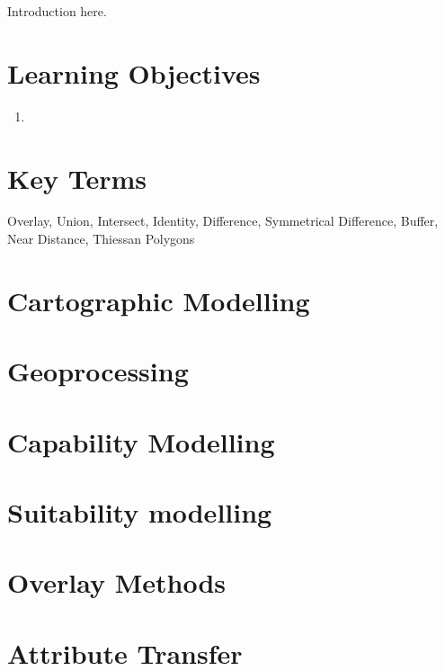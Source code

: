 \documentclass[
]{book}
\providecommand{\tightlist}{%
  \setlength{\itemsep}{0pt}\setlength{\parskip}{0pt}}
\begin{document}
Introduction here.

\hypertarget{learning-objectives-5}{%
\section*{Learning Objectives}\label{learning-objectives-5}}

\begin{enumerate}
\def\labelenumi{\arabic{enumi}.}
\tightlist
\item
\end{enumerate}

\hypertarget{key-terms-5}{%
\section*{Key Terms}\label{key-terms-5}}

Overlay, Union, Intersect, Identity, Difference, Symmetrical Difference, Buffer, Near Distance, Thiessan Polygons

\hypertarget{cartographic-modelling}{%
\section{Cartographic Modelling}\label{cartographic-modelling}}

\hypertarget{geoprocessing}{%
\section{Geoprocessing}\label{geoprocessing}}

\hypertarget{capability-modelling}{%
\section{Capability Modelling}\label{capability-modelling}}

\hypertarget{suitability-modelling}{%
\section{Suitability modelling}\label{suitability-modelling}}

\hypertarget{overlay-methods}{%
\section{Overlay Methods}\label{overlay-methods}}

\hypertarget{attribute-transfer}{%
\section{Attribute Transfer}\label{attribute-transfer}}
\end{document}
